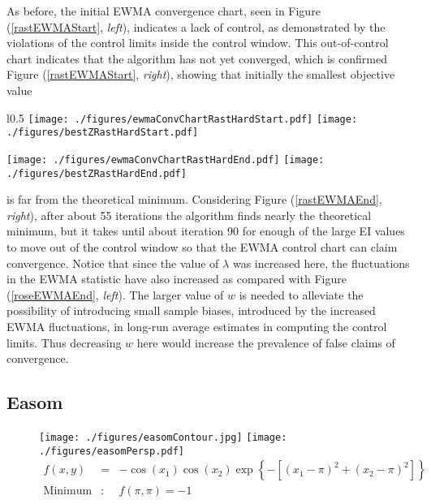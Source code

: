 \documentclass[12pt]{article}
\begin{document}
	
	As before, the initial EWMA convergence chart, seen in Figure (\ref{rastEWMAStart}, {\it left}), indicates a lack of control, as demonstrated by the violations of the control limits inside the control window.
	This out-of-control chart indicates that the algorithm has not yet converged, which is confirmed Figure (\ref{rastEWMAStart}, {\it right}), showing that initially the smallest objective value
	\begin{wrapfigure}{l}{0.5\textwidth}
	\texttt{[image: ./figures/ewmaConvChartRastHardStart.pdf]}
	\texttt{[image: ./figures/bestZRastHardStart.pdf]}
	\caption{Initial EWMA convergence chart and smallest objective function value. }
	\label{rastEWMAStart}
	$~$\\
	\texttt{[image: ./figures/ewmaConvChartRastHardEnd.pdf]}
	\texttt{[image: ./figures/bestZRastHardEnd.pdf]}
	\caption{Final EWMA convergence chart and smallest objective function value. }
	\label{rastEWMAEnd}
	\end{wrapfigure}
	is far from the theoretical minimum.
	Considering Figure (\ref{rastEWMAEnd}, {\it right}), after about 55 iterations the algorithm finds nearly the theoretical minimum, but it takes until about iteration 90 for enough of the large EI values to move out of the control window so that the EWMA control chart can claim convergence.
	Notice that since the value of $\lambda$ was increased here, the fluctuations in the EWMA statistic have also increased as compared with Figure (\ref{roseEWMAEnd}, {\it left}).
	The larger value of $w$ is needed to alleviate the possibility of introducing small sample biases, introduced by the increased EWMA fluctuations, in long-run average estimates in computing the control limits.
	Thus decreasing $w$ here would increase the prevalence of false claims of convergence.
	
	\clearpage
	\subsection{Easom}
	
	\begin{figure}[!h]
	\centering
	\texttt{[image: ./figures/easomContour.jpg]}
	\texttt{[image: ./figures/easomPersp.pdf]}
	\vspace{-0.2cm}
	\begin{eqnarray}
	f(x,y) &=& -\cos \left(x_1\right)\cos \left(x_2\right) \exp\left\{-\left[\left(x_1-\pi\right)^{2} + \left(x_2-\pi\right)^{2}\right]\right\}\\
	\text{Minimum}&:& f(\pi, \pi)=-1\nonumber
	\end{eqnarray}
	\end{figure}
	\vspace{-0.3cm}
	
\end{document}
